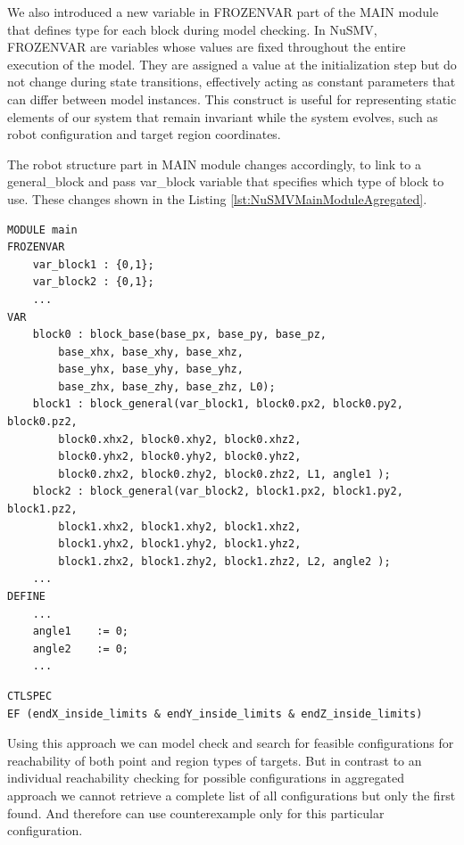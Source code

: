 We also introduced a new variable in FROZENVAR part of the MAIN module that defines 
type for each block during model checking. 
In NuSMV, FROZENVAR are variables whose values are fixed throughout the 
entire execution of the model. They are assigned a value at the initialization 
step but do not change during state transitions, effectively acting as 
constant parameters that can differ between model instances. 
This construct is useful for representing static elements of our system that
remain invariant while the system evolves, such as robot configuration 
and target region coordinates.

The robot structure part in MAIN module changes accordingly, to link to 
a general\_block and pass var\_block variable that specifies which type of block to use.
These changes shown in the Listing \ref{lst:NuSMVMainModuleAgregated}.

\begin{lstlisting}[language=NuSMV, caption={Changes in main module to go over different types of blocks}, 
    label={lst:NuSMVMainModuleAgregated}]
MODULE main
FROZENVAR
    var_block1 : {0,1};
    var_block2 : {0,1};
    ...
VAR
    block0 : block_base(base_px, base_py, base_pz,
        base_xhx, base_xhy, base_xhz,
        base_yhx, base_yhy, base_yhz,
        base_zhx, base_zhy, base_zhz, L0);
    block1 : block_general(var_block1, block0.px2, block0.py2, block0.pz2,
        block0.xhx2, block0.xhy2, block0.xhz2,
        block0.yhx2, block0.yhy2, block0.yhz2,
        block0.zhx2, block0.zhy2, block0.zhz2, L1, angle1 );
    block2 : block_general(var_block2, block1.px2, block1.py2, block1.pz2,
        block1.xhx2, block1.xhy2, block1.xhz2,
        block1.yhx2, block1.yhy2, block1.yhz2,
        block1.zhx2, block1.zhy2, block1.zhz2, L2, angle2 );
    ...
DEFINE
    ...
    angle1    := 0;
    angle2    := 0;
    ...
\end{lstlisting}


\begin{lstlisting}[language=NuSMV, caption={Reachability condition in CTL specification}, 
    label={lst:CTLSpec}]
CTLSPEC 
EF (endX_inside_limits & endY_inside_limits & endZ_inside_limits)
\end{lstlisting}

Using this approach we can model check and search for feasible configurations for
reachability of both point and region  types of targets.
But in contrast to an individual reachability checking for possible configurations 
in aggregated approach we cannot retrieve a complete list of all configurations but only the 
first found. And therefore can use counterexample only for this particular configuration.




